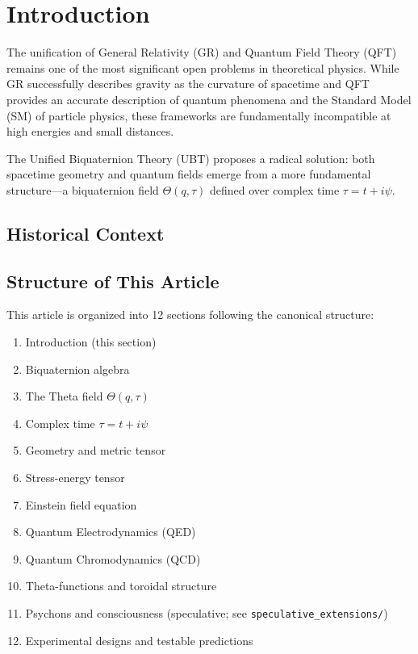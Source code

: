 \documentclass[12pt,a4paper]{article}
\begin{document}
\vspace{1em}

\tableofcontents


\section{Introduction}
\label{sec:introduction}


The unification of General Relativity (GR) and Quantum Field Theory (QFT) remains one of the most significant open problems in theoretical physics. While GR successfully describes gravity as the curvature of spacetime and QFT provides an accurate description of quantum phenomena and the Standard Model (SM) of particle physics, these frameworks are fundamentally incompatible at high energies and small distances.

The Unified Biquaternion Theory (UBT) proposes a radical solution: both spacetime geometry and quantum fields emerge from a more fundamental structure—a biquaternion field $\Theta(q,\tau)$ defined over complex time $\tau = t + i\psi$.

\subsection{Historical Context}


\subsection{Structure of This Article}

This article is organized into 12 sections following the canonical structure:

\begin{enumerate}
    \item Introduction (this section)
    \item Biquaternion algebra
    \item The Theta field $\Theta(q,\tau)$
    \item Complex time $\tau = t + i\psi$
    \item Geometry and metric tensor
    \item Stress-energy tensor
    \item Einstein field equation
    \item Quantum Electrodynamics (QED)
    \item Quantum Chromodynamics (QCD)
    \item Theta-functions and toroidal structure
    \item Psychons and consciousness (speculative; see \texttt{speculative\_extensions/})
    \item Experimental designs and testable predictions
\end{enumerate}
\end{document}
